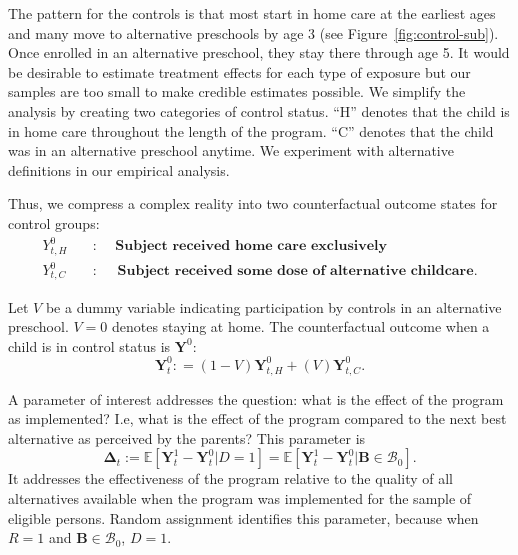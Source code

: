 The pattern for the controls is that most start in home care at the earliest ages and many move to alternative preschools by age 3 (see Figure~\ref{fig:control-sub}). Once enrolled in an alternative preschool, they stay there through age 5. It would be desirable to estimate treatment effects for each type of exposure but our samples are too small to make credible estimates possible. We simplify the analysis by creating two categories of control status. ``H'' denotes that the child is in home care throughout the length of the program. ``C'' denotes that the child was in an alternative preschool anytime. We experiment with alternative definitions in our empirical analysis.

Thus, we compress a complex reality into two counterfactual outcome states for control groups:
\begin{align*}
Y_{t,H}^0 \quad &: \quad \textbf{ Subject received home care exclusively} \\
Y_{t,C}^0 \quad &: \quad \textbf{ Subject received some dose of alternative childcare}.
\end{align*}

Let $V$ be a dummy variable indicating participation by controls in an alternative preschool. $V=0$ denotes staying at home. The counterfactual outcome when a child is in control status is $\bm{Y}^0$:
\begin{equation}
\bm{Y}^0_t : = \left( 1 - V \right) \bm{Y}^0_{t,H} + \left( V \right) \bm{Y}^0_{t,C}.
\end{equation}

A parameter of interest addresses the question: what is the effect of the program as implemented? I.e, what is the effect of the program compared to the next best alternative as perceived by the parents? This parameter is
\begin{equation}\label{eq:effect}
\bm{\Delta}_t := \mathbb{E} \left[ \bm{Y}^1_t -  \bm{Y}^0_t | D =1 \right] = \mathbb{E} \left[\bm{Y}^1_t - \bm{Y}^0_t | \bm{B} \in \mathcal{B}_0 \right].
\end{equation}
It addresses the effectiveness of the program relative to the quality of all alternatives available when the program was implemented for the sample of eligible persons. Random assignment identifies this parameter, because when $R=1$ and $\bm{B} \in \mathcal{B}_0$, $D=1$.

